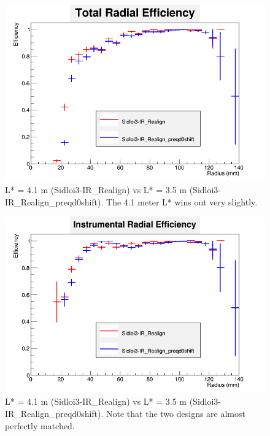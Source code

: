\documentclass{report}
\begin{document}
                \begin{figure}[H] 
                    \includegraphics[height=.4\textheight]{RadialEfficiencyFP_total}
                    \centering
                    \caption{L* = 4.1 m (Sidloi3-IR\_Realign) vs L* = 3.5 m (Sidloi3-IR\_Realign\_preqd0shift). The 4.1 meter L* wins out very slightly.}
                    \label{fig__lstar_beamcal_total}
                \end{figure}
                \begin{figure}[H]
                    \includegraphics[height=.4\textheight]{RadialEfficiencyFP_instrumental}
                    \centering
                    \caption{L* = 4.1 m (Sidloi3-IR\_Realign) vs L* = 3.5 m (Sidloi3-IR\_Realign\_preqd0shift). Note that the two designs are almost perfectly matched. }
                    \label{fig__lstar_beamcal_inst}
                \end{figure}
\end{document}
